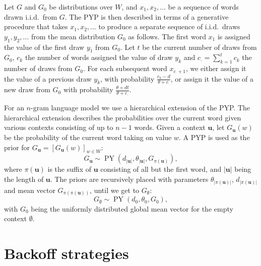   Let $G$ and $G_0$ be distributions over $W$, and $x_1,x_2,\ldots$ be a sequence of words drawn i.i.d.\ from $G$. The PYP is then described in terms of a generative procedure that takes  $x_1,x_2,\ldots$ to produce a separate sequence of i.i.d.\ draws $y_1,y_2,\ldots$ from the mean distribution $G_0$ as follows. The first word $x_1$ is assigned the value of the first draw $y_1$ from $G_0$. Let $t$ be the current number of draws from $G_0$, $c_k$ the number of words assigned the value of draw $y_k$ and $c_\cdot = \sum^t_{k=1}c_k$ the number of draws from $G_0$. For each subsequent word $x_{c_\cdot+1}$, we either assign it the value of a previous draw $y_k$, with probability $\frac{c_k-d}{\theta+c_\cdot}$, or assign it the value of a new draw from $G_0$ with probability $\frac{\theta+dt}{\theta+c_\cdot}$.

For an $n$-gram language model we use a hierarchical extension of the PYP. The hierarchical extension describes the probabilities over the current word given various contexts consisting of up to $n-1$ words. Given a context $\mathbf{u}$, let $G_\mathbf{u}(w)$ be the probability of the current word taking on value $w$. A PYP is used as the prior for $G_\mathbf{u}=[G_\mathbf{u}(w)]_{w\in W}$: 
  \begin{equation*}
  	G_\mathbf{u}\sim\operatorname{PY}(d_{|\mathbf{u}|}, \theta_{|\mathbf{u}|},G_{\pi(\mathbf{u})}),
  \end{equation*}
where $\pi(\mathbf{u})$ is the suffix of $\mathbf{u}$ consisting of all but the first word, and $|\mathbf{u}|$ being the length of $\mathbf{u}$. The priors are recursively placed with parameters $\theta_{|\pi(\mathbf{u})|}$, $d_{|\pi(\mathbf{u})|}$ and mean vector $G_{\pi(\pi(\mathbf{u}))}$, until we get to $G_\emptyset$: 		\begin{equation*}
		G_\emptyset \sim\operatorname{PY}(d_0,\theta_0,G_0),
    \end{equation*}\vspace{-0.05cm}
with $G_0$ being the uniformly distributed global mean vector for the empty context $\emptyset$.

\section{Backoff strategies}

